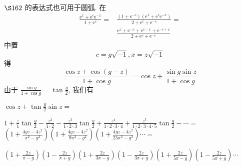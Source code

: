 $\S 162$ 的表达式也可用于圆弧. 在
\[
\begin{aligned}
\frac{\mathrm{e}^{x}+\mathrm{e}^{c} \mathrm{e}^{-x}}{1+\mathrm{e}^{c}}= & \frac{\left(1+\mathrm{e}^{-c}\right)\left(\mathrm{e}^{x}+\mathrm{e}^{c} \mathrm{e}^{-x}\right)}{2+\mathrm{e}^{c}+\mathrm{e}^{-c}}= \\
& \frac{\mathrm{e}^{x}+\mathrm{e}^{-x}+\mathrm{e}^{c-x}+\mathrm{e}^{-c+x}}{2+\mathrm{e}^{c}+\mathrm{e}^{-c}}
\end{aligned}
\]
中置
\[
c=g \sqrt{-1}, x=z \sqrt{-1}
\]
得
\[
\frac{\cos z+\cos (g-z)}{1+\cos g}=\cos z+\frac{\sin g \sin z}{1+\cos g}
\]
由于 $\frac{\sin g}{1+\cos g}=\tan \frac{g}{2}$, 我们有

$\cos z+\tan \frac{g}{2} \sin z=$

$1+\frac{z}{1} \tan \frac{g}{2}-\frac{z^{2}}{1 \cdot 2}-\frac{z^{3}}{1 \cdot 2 \cdot 3} \tan \frac{g}{2}+\frac{z^{4}}{1 \cdot 2 \cdot 3 \cdot 4}+\frac{z^{5}}{1 \cdot 2 \cdot 3 \cdot 4 \cdot 5} \tan \frac{g}{2}-\cdots=$ $\left(1+\frac{4 g z-4 z^{2}}{\pi^{2}-g^{2}}\right)\left(1+\frac{4 g z-4 z^{2}}{9 \pi^{2}-g^{2}}\right)\left(1+\frac{4 g z-4 z^{2}}{25 \pi^{2}-g^{2}}\right) \cdots=$

$\left(1+\frac{2 z}{\pi-g}\right)\left(1-\frac{2 z}{\pi+g}\right)\left(1+\frac{2 z}{3 \pi-g}\right)\left(1-\frac{2 z}{3 \pi+g}\right)\left(1+\frac{2 z}{5 \pi-g}\right)\left(1-\frac{2 z}{5 \pi+g}\right) \cdots$

